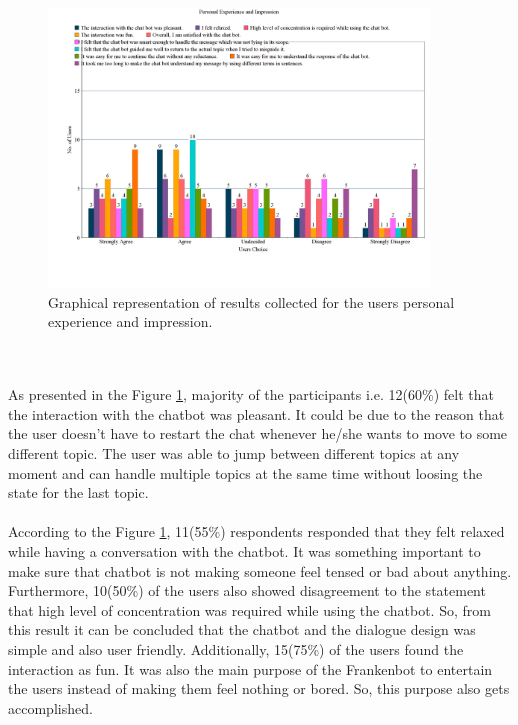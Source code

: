 \begin{figure}[!h]
    \centering
    \includegraphics[width=0.9\textwidth]{img/Personal_Experience_and_Impression.png}
    \caption{Graphical representation of results collected for the users personal experience and impression.}
    \label{fig:persExpandImp}
\end{figure}
\\~\\
As presented in the Figure \ref{fig:persExpandImp}, majority of the participants i.e. 12(60\%) felt that the interaction with the chatbot was pleasant. It could be due to the reason that the user doesn't have to restart the chat whenever he/she wants to move to some different topic. The user was able to jump between different topics at any moment and can handle multiple topics at the same time without loosing the state for the last topic. 
\\~\\
According to the Figure \ref{fig:persExpandImp}, 11(55\%) respondents responded that they felt relaxed while having a conversation with the chatbot. It was something important to make sure that chatbot is not making someone feel tensed or bad about anything. Furthermore, 10(50\%) of the users also showed disagreement to the statement that high level of concentration was required while using the chatbot. So, from this result it can be concluded that the chatbot and the dialogue design was simple and also user friendly. Additionally, 15(75\%) of the users found the interaction as fun. It was also the main purpose of the Frankenbot to entertain the users instead of making them feel nothing or bored. So, this purpose also gets accomplished. 
\\~\\
